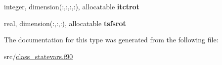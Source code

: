 \begin{DoxyCompactItemize}
\item 
\hypertarget{structclass__statevars_1_1class__rotated_aa6882c9893af7cb1e2836d91e68a9c92}{}integer, dimension(\+:,\+:,\+:,\+:), allocatable {\bfseries itctrot}\label{structclass__statevars_1_1class__rotated_aa6882c9893af7cb1e2836d91e68a9c92}

\item 
\hypertarget{structclass__statevars_1_1class__rotated_aa343682d0c66fd1d1f8e5639cbffbb4c}{}real, dimension(\+:,\+:,\+:), allocatable {\bfseries tsfsrot}\label{structclass__statevars_1_1class__rotated_aa343682d0c66fd1d1f8e5639cbffbb4c}

\end{DoxyCompactItemize}


The documentation for this type was generated from the following file\+:\begin{DoxyCompactItemize}
\item 
src/\hyperlink{class__statevars_8f90}{class\+\_\+statevars.\+f90}\end{DoxyCompactItemize}
